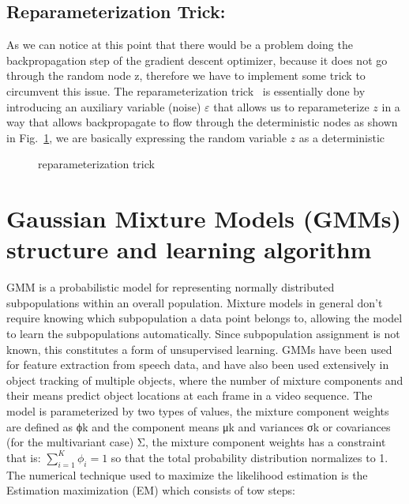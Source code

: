 \subsection{Reparameterization Trick:}
As we can notice at this point that there would be a problem doing the backpropagation step of the gradient descent optimizer, because it does not go through the random node z, therefore we have to implement some trick to circumvent this issue. The reparameterization trick~\cite{kingma2013auto} is essentially done by introducing an auxiliary variable (noise) $\varepsilon$ that allows us to reparameterize $z$ in a way that allows backpropagate to flow through the deterministic nodes as shown in Fig.~\ref{fig:paratrick}, we are basically expressing the random variable $z$ as a deterministic 

\begin{figure}
	\centerline
	\paratrick
	\caption{reparameterization trick}
	\label{fig:paratrick}
\end{figure} 

\section{Gaussian Mixture Models (GMMs) structure and learning algorithm}

\label{cha:GMM}
GMM is a probabilistic model for representing normally distributed subpopulations within an overall population. Mixture models in general don't require knowing which subpopulation a data point belongs to, allowing the model to learn the subpopulations automatically. Since subpopulation assignment is not known, this constitutes a form of unsupervised learning. GMMs have been used for feature extraction from speech data, and have also been used extensively in object tracking of multiple objects, where the number of mixture components and their means predict object locations at each frame in a video sequence.
The model is parameterized by two types of values, the mixture component weights are defined as ϕk and the component means μk and variances σk or covariances (for the multivariant case) Σ, the mixture component weights has a constraint that is:  $\sum_{i=1}^{K} \phi_i = 1$ so that the total probability distribution normalizes to 1. The numerical technique used to maximize the likelihood estimation is the Estimation maximization (EM) which consists of tow steps:

